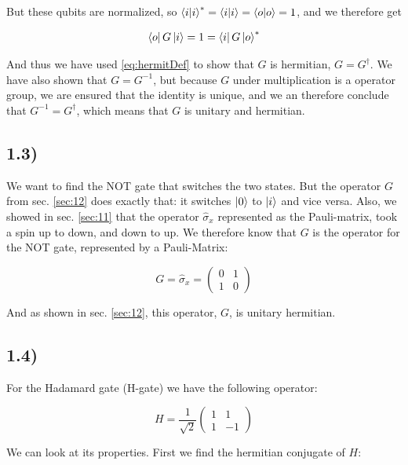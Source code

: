 \documentclass[a4paper,norsk, 10pt]{article}
\begin{document}
But these qubits are normalized, so $\braket{i}{i}^*=  \braket{i}{i}=  \braket{o}{o} = 1$, and we therefore get

\begin{equation}
\bra{o}G\ket{i} = 1 = \bra{i}G\ket{o}^*
\end{equation}

And thus we have used \eqref{eq:hermitDef} to show that $G$ is hermitian, $G = G^\dagger$. We have also shown that $G = G^{-1}$, but because $G$ under multiplication is a operator group, we are ensured that the identity is unique, and we an therefore conclude that $G^{-1} = G^\dagger$, which means that $G$ is unitary and hermitian.

\subsection{1.3)}

We want to find the NOT gate that switches the two states. But the operator $G$ from sec. \ref{sec:12} does exactly that: it switches $\ket{0}$ to $\ket{i}$ and vice versa. Also, we showed in sec. \ref{sec:11} that the operator $\hat{\sigma}_x$ represented as the Pauli-matrix, took a spin up to down, and down to up. We therefore know that $G$ is the operator for the NOT gate, represented by a Pauli-Matrix:

\begin{equation}
G = \hat{\sigma}_x =
\begin{pmatrix}
0 & 1\\
1 & 0
\end{pmatrix}
\end{equation}

And as shown in sec. \ref{sec:12}, this operator, $G$, is unitary hermitian.

\subsection{1.4)}
For the Hadamard gate (H-gate) we have the following operator:

\begin{equation}
H = \frac{1}{\sqrt{2}}
\begin{pmatrix}
1 & 1 \\
1 & -1
\end{pmatrix}
\label{eq:H}
\end{equation}

We can look at its properties. First we find the hermitian conjugate of $H$:
\end{document}
